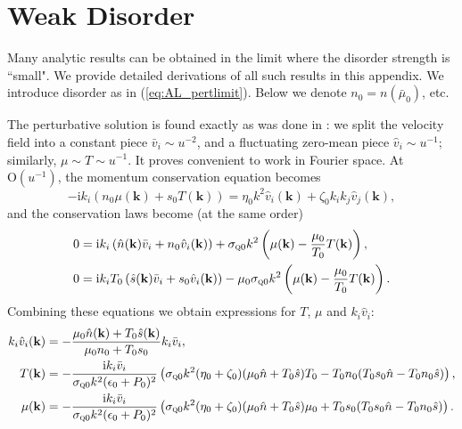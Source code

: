 \section{Weak Disorder}\label{appmom}
Many analytic results can be obtained in the limit where the disorder strength is ``small".   We provide detailed derivations of all such results in this appendix.    We introduce disorder as in (\ref{eq:AL_pertlimit}).    Below we denote $n_0 = n(\bar\mu_0)$, etc.

The perturbative solution is found exactly as was done in \cite{lucas_hydrodynamic_2015}:   we split the velocity field into a constant piece $\bar v_i \sim u^{-2}$, and a fluctuating zero-mean piece $\hat v_i \sim u^{-1}$;  similarly, $ \mu \sim  T \sim u^{-1}$.   It proves convenient to work in Fourier space.   At $\mathrm{O}(u^{-1})$, the momentum conservation equation becomes \begin{equation}
-\mathrm{i}k_i \left(n_0  \mu(\mathbf{k})+s_0 T(\mathbf{k})\right) = \eta_0 k^2  \hat v_i(\mathbf{k}) + \zeta_0 k_ik_j  \hat v_j(\mathbf{k}),
\end{equation} 
and the conservation laws become (at the same order) \begin{subequations}\begin{align}
0 &= \mathrm{i}k_i \left(\hat n(\mathbf{k})  \bar v_i + n_0  \hat v_i(\mathbf{k})\right)+ \sigma_{\textsc{q}0} k^2 \left( \mu(\mathbf{k}) - \frac{\mu_0}{T_0} T(\mathbf{k})\right), \\
0 &= \mathrm{i}k_i T_0 \left(\hat s(\mathbf{k})  \bar v_i + s_0  \hat v_i(\mathbf{k})\right) -\mu_0\sigma_{\textsc{q}0} k^2 \left( \mu(\mathbf{k}) - \frac{\mu_0}{T_0} T(\mathbf{k})\right).
\end{align}\end{subequations}
Combining these equations we obtain expressions for $ T$, $ \mu$ and $k_i  \hat v_i$: \begin{subequations}\begin{align}
k_i  \hat v_i(\mathbf{k}) &= -\frac{\mu_0 \hat n(\mathbf{k}) + T_0\hat s(\mathbf{k})}{\mu_0 n_0 + T_0s_0} k_i  \bar v_i, \\
 T(\mathbf{k}) &= -\frac{\mathrm{i}k_i  \bar v_i}{\sigma_{\textsc{q}0}k^2(\epsilon_0+P_0)^2}\left(\sigma_{\textsc{q}0}k^2 (\eta_0+\zeta_0)(\mu_0 \hat n + T_0\hat s)T_0 - T_0n_0(T_0s_0\hat n-T_0n_0\hat s)\right), \\
 \mu(\mathbf{k}) &= -\frac{\mathrm{i}k_i  \bar v_i}{\sigma_{\textsc{q}0}k^2(\epsilon_0+P_0)^2}\left(\sigma_{\textsc{q}0}k^2 (\eta_0+\zeta_0)(\mu_0 \hat n + T_0\hat s)\mu_0 + T_0s_0(T_0s_0\hat n-T_0n_0\hat s)\right).
\end{align}\end{subequations}
